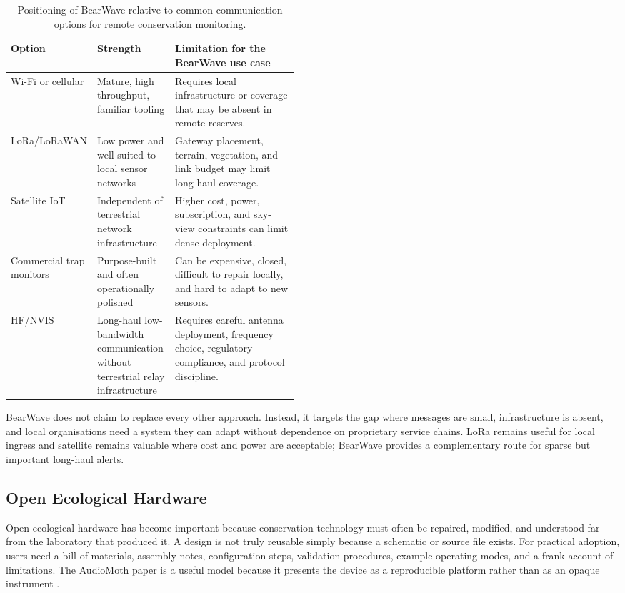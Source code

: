 \documentclass[acmsmall,screen]{acmart}
\begin{document}
\begin{table}[H]
\caption{Positioning of BearWave relative to common communication options for remote conservation monitoring.}
\label{tab:communication-options}
\begin{tabularx}{\linewidth}{p{0.20\linewidth}p{0.27\linewidth}X}
\toprule
Option & Strength & Limitation for the BearWave use case \\
\midrule
Wi-Fi or cellular & Mature, high throughput, familiar tooling & Requires local infrastructure or coverage that may be absent in remote reserves. \\
LoRa/LoRaWAN & Low power and well suited to local sensor networks & Gateway placement, terrain, vegetation, and link budget may limit long-haul coverage. \\
Satellite IoT & Independent of terrestrial network infrastructure & Higher cost, power, subscription, and sky-view constraints can limit dense deployment. \\
Commercial trap monitors & Purpose-built and often operationally polished & Can be expensive, closed, difficult to repair locally, and hard to adapt to new sensors. \\
HF/NVIS & Long-haul low-bandwidth communication without terrestrial relay infrastructure & Requires careful antenna deployment, frequency choice, regulatory compliance, and protocol discipline. \\
\bottomrule
\end{tabularx}
\end{table}

BearWave does not claim to replace every other approach. Instead, it targets the gap where messages are small, infrastructure is absent, and local organisations need a system they can adapt without dependence on proprietary service chains. LoRa remains useful for local ingress and satellite remains valuable where cost and power are acceptable; BearWave provides a complementary route for sparse but important long-haul alerts.

\subsection{Open Ecological Hardware}
Open ecological hardware has become important because conservation technology must often be repaired, modified, and understood far from the laboratory that produced it. A design is not truly reusable simply because a schematic or source file exists. For practical adoption, users need a bill of materials, assembly notes, configuration steps, validation procedures, example operating modes, and a frank account of limitations. The AudioMoth paper is a useful model because it presents the device as a reproducible platform rather than as an opaque instrument \cite{Hill2019AudioMothHardware}.
\end{document}
